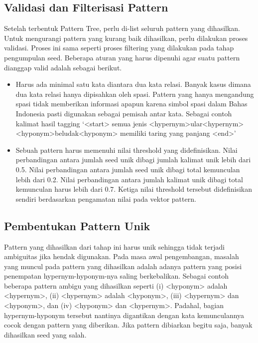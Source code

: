 \subsection{Validasi dan Filterisasi Pattern}
Setelah terbentuk Pattern Tree, perlu di-list seluruh pattern yang dihasilkan. Untuk mengurangi pattern yang kurang baik dihasilkan, perlu dilakukan proses validasi. Proses ini sama seperti proses filtering yang dilakukan pada tahap pengumpulan seed. Beberapa aturan yang harus dipenuhi agar suatu pattern dianggap valid adalah sebagai berikut.
\begin{itemize}
  \item Harus ada minimal satu kata diantara dua kata relasi. Banyak kasus dimana dua kata relasi hanya dipisahkan oleh spasi. Pattern yang hanya mengandung spasi tidak memberikan informasi apapun karena simbol spasi dalam Bahas Indonesia pasti digunakan sebagai pemisah antar kata. Sebagai contoh kalimat hasil tagging ‘<start> semua jenis <hypernym>ular<hypernym> <hyponym>beludak<hyponym> memiliki taring yang panjang <end>’
  \item Sebuah pattern harus memenuhi nilai threshold yang didefinisikan. Nilai perbandingan antara jumlah seed unik dibagi jumlah kalimat unik lebih dari 0.5. Nilai perbandingan antara jumlah seed unik dibagi total kemunculan lebih dari 0.2. Nilai perbandingan antara jumlah kalimat unik dibagi total kemunculan harus lebih dari 0.7. Ketiga nilai threshold tersebut didefinisikan sendiri berdasarkan pengamatan nilai pada vektor pattern.
\end{itemize}

\subsection{Pembentukan Pattern Unik}
Pattern yang dihasilkan dari tahap ini harus unik sehingga tidak terjadi ambiguitas jika hendak digunakan. Pada masa awal pengembangan, masalah yang muncul pada pattern yang dihasilkan adalah adanya pattern yang posisi penempatan hypernym-hyponym-nya saling berkebalikan. Sebagai contoh beberapa pattern ambigu yang dihasilkan seperti (i) <hyponym> adalah <hypernym>, (ii) <hypernym> adalah <hyponym>, (iii) <hypernym> dan <hyponym>, dan (iv) <hyponym> dan <hypernym>. Padahal, bagian hypernym-hyponym tersebut nantinya digantikan dengan kata kemunculannya cocok dengan pattern yang diberikan. Jika pattern dibiarkan begitu saja, banyak dihasilkan seed yang salah.

